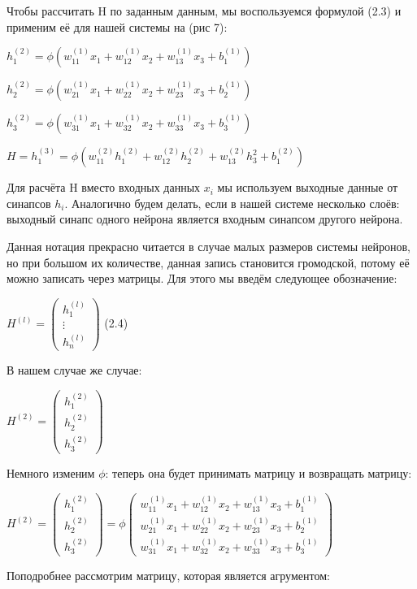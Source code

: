 \documentclass[12pt]{extarticle}
\begin{document}
	Чтобы рассчитать H по заданным данным, мы воспользуемся формулой (2.3) и применим её для нашей системы на (рис 7):
	
	\centerline{$h_1^{(2)} = \phi(w_{11}^{(1)}x_1 + w_{12}^{(1)}x_2  + w_{13}^{(1)}x_3 + b_1^{(1)})$}
	\centerline{$h_2^{(2)} = \phi(w_{21}^{(1)}x_1 + w_{22}^{(1)}x_2  + w_{23}^{(1)}x_3 + b_2^{(1)})$}
	\centerline{$h_3^{(2)} = \phi(w_{31}^{(1)}x_1 + w_{32}^{(1)}x_2  + w_{33}^{(1)}x_3 + b_3^{(1)})$}
	\centerline{$H = h_1^{(3)} = \phi(w_{11}^{(2)}h_1^{(2)} + w_{12}^{(2)}h_2^{(2)}   + w_{13}^{(2)}h_3^{2} + b_1^{(2)})$}
	
	Для расчёта H вместо входных данных $x_i$ мы используем выходные данные от синапсов $h_i$. Аналогично будем делать, если в нашей системе несколько слоёв: выходный синапс одного нейрона является входным синапсом другого нейрона.
	
	Данная нотация прекрасно читается в случае малых размеров системы нейронов, но при большом их количестве, данная запись становится громодской, потому её можно записать через матрицы. Для этого мы введём следующее обозначение:
	
	\centerline{ $H^{(l)} = \begin{pmatrix}
		h_1^{(l)} \\
		\vdots \\
		h_n^{(l)}
	\end{pmatrix}$ (2.4)}
	
	В нашем случае же случае:
	
	\centerline{$H^{(2)} = \begin{pmatrix}
		h_1^{(2)} \\
		h_2^{(2)} \\
		h_3^{(2)}
	\end{pmatrix}$}
	
	Немного изменим $\phi$: теперь она будет принимать матрицу и возвращать матрицу:
	
	\centerline{$H^{(2)} = \begin{pmatrix}
		h_1^{(2)} \\
		h_2^{(2)} \\
		h_3^{(2)}
	\end{pmatrix} = \phi\begin{pmatrix}
		w_{11}^{(1)}x_1 + w_{12}^{(1)}x_2  + w_{13}^{(1)}x_3 + b_1^{(1)} \\
		w_{21}^{(1)}x_1 + w_{22}^{(1)}x_2  + w_{23}^{(1)}x_3 + b_2^{(1)} \\
		w_{31}^{(1)}x_1 + w_{32}^{(1)}x_2  + w_{33}^{(1)}x_3 + b_3^{(1)} \end{pmatrix}$}
	Поподробнее рассмотрим матрицу, которая является агрументом:
	
\end{document}
